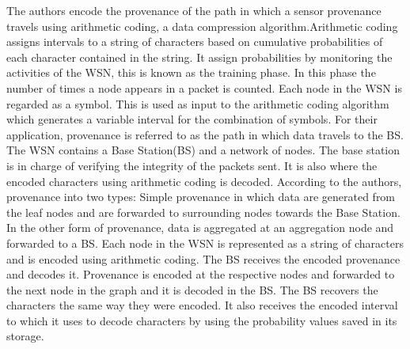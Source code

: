 The authors \cite{hussain_secure_2014} encode the provenance of the path in which a sensor provenance travels using arithmetic coding, a data compression algorithm.Arithmetic coding assigns intervals to a string of characters based on  cumulative probabilities of each character contained in the string. It assign probabilities by monitoring the activities of the WSN, this is known as the training phase. In this phase the number of times a node appears in a packet is counted.  Each node in the WSN is regarded as a symbol. This is used as input to the arithmetic coding algorithm which generates a variable interval for the combination of symbols. For their application, provenance is referred to as the path in which data travels to the BS. The WSN contains a Base Station(BS) and a network of nodes. The base station is in charge of verifying the integrity of the packets sent. It is also where the encoded characters using arithmetic coding is decoded.  According to the authors, provenance into two types: Simple provenance in which data are generated from the leaf nodes and are forwarded to surrounding nodes towards the Base Station. In the other form of provenance, data is aggregated at an aggregation node and forwarded to a BS. Each node in the WSN is represented as a string of characters and is encoded using arithmetic coding. The BS receives the encoded provenance and decodes it. Provenance is encoded at the respective nodes and forwarded to the next node in the graph and it is decoded in the BS. The BS recovers the characters the same way they were encoded. It also receives the encoded interval to which it uses to decode characters by using the probability values saved in its storage.



















